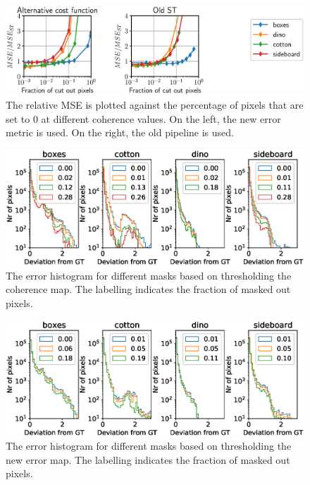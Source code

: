 \documentclass  [
  paper    = a4,
  BCOR     = 10mm,
  twoside,
  fontsize = 12pt,
  fleqn,
  toc      = bibnumbered,
  toc      = listofnumbered,
  numbers  = noendperiod,
  headings = normal,
  listof   = leveldown,
  version  = 3.03
]                                       {scrreprt}
\begin{document}
\begin{figure}[h!]
	\centering
	\includegraphics[width=1\linewidth]{images/newerror_confidence}
	\caption[Dependence of error on cut out pixels]{The relative MSE is plotted against the percentage of pixels that are set to 0 at different coherence values. On the left, the new error metric is used. On the right, the old pipeline is used.}
	\label{fig:newerrorconfidence}
\end{figure}
\begin{figure}[h!]
	\centering
	\includegraphics[width=1\linewidth]{images/histogram_error_mask_old}
	\caption[Histogram when masking errors]{The error histogram for different masks based on thresholding the coherence map. The labelling indicates the fraction of masked out pixels.}
	\label{fig:histogramerrormaskold}
\end{figure}
\begin{figure}[h!]
	\centering
	\includegraphics[width=1\linewidth]{images/histogram_error_mask_new_err}
	\caption[Histogram when masking errors with new error map]{The error histogram for different masks based on thresholding the new error map. The labelling indicates the fraction of masked out pixels.}
	\label{fig:histogramerrormasknewerr}
\end{figure}
\end{document}
